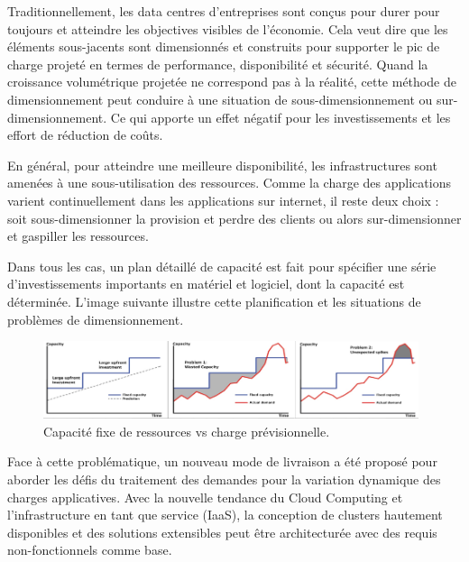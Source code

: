Traditionnellement, les data centres d'entreprises sont conçus pour durer pour toujours et atteindre les objectives visibles de l'économie. Cela veut dire que les éléments sous-jacents sont dimensionnés et construits pour supporter le pic de charge projeté en termes de performance, disponibilité et sécurité. Quand la croissance volumétrique projetée ne correspond pas à la réalité, cette méthode de dimensionnement peut conduire à une situation de sous-dimensionnement ou sur-dimensionnement. Ce qui apporte un effet négatif pour les investissements et les effort de réduction de coûts.

En général, pour atteindre une meilleure disponibilité, les infrastructures sont amenées à une sous-utilisation des ressources. Comme la charge des applications varient continuellement dans les applications sur internet, il reste deux choix : soit sous-dimensionner la provision et perdre des clients ou alors sur-dimensionner et gaspiller les ressources. 

Dans tous les cas, un plan détaillé de capacité est fait pour spécifier une série d'investissements importants en matériel et logiciel, dont la capacité est déterminée. L'image suivante illustre cette planification et les situations de problèmes de dimensionnement.


\begin{figure}[h]
\begin{center}
\includegraphics[width=0.98\textwidth]{images/fixed_capacity_load_prediction} 
\caption{Capacité fixe de ressources vs charge prévisionnelle. \cite{awsScaling}}
\end{center}
\end{figure}

Face à cette problématique, un nouveau mode de livraison a été proposé pour aborder les défis du traitement des demandes pour la variation dynamique des charges applicatives. Avec la nouvelle tendance du Cloud Computing et l'infrastructure en tant que service (IaaS), la conception de clusters hautement disponibles et des solutions extensibles peut être architecturée avec des requis non-fonctionnels comme base. 

